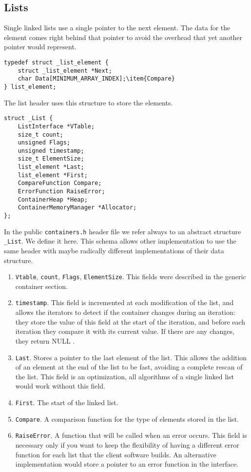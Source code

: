 \documentclass[12pt,a4paper]{memoir} %
\newcommand{\Null}{
{\footnotesize NULL}
}
\begin{document}
{{\subsection{Lists}
Single linked lists use a single pointer to the next element. The data for the element comes right behind that pointer to avoid the overhead that yet another pointer would represent.
\begin{verbatim}
typedef struct _list_element {
    struct _list_element *Next;
    char Data[MINIMUM_ARRAY_INDEX];\item{Compare}
} list_element;
\end{verbatim}
The list header uses this structure to store the elements.
\begin{verbatim}
struct _List {
    ListInterface *VTable;  
    size_t count;           
    unsigned Flags;	
    unsigned timestamp;   
    size_t ElementSize;   
    list_element *Last;   
    list_element *First;  
    CompareFunction Compare; 
    ErrorFunction RaiseError; 
    ContainerHeap *Heap;
    ContainerMemoryManager *Allocator;
};
\end{verbatim}
In the public \texttt{containers.h} header file we refer always to an abstract structure \texttt{\_List}. We define it here. This schema allows other implementation to use the same header with maybe radically different implementations of their data structure.
\begin{enumerate}
\item \texttt{Vtable}, \texttt{count}, \texttt{Flags}, \texttt{ElementSize}. This fields were described in the generic container section.
\item \texttt{timestamp}. This field is incremented at each modification of the list, and allows the iterators to detect if the container changes during an iteration: they store the value of this field at the start of the iteration, and before each iteration they compare it with its current value. If there are any changes, they return\Null.
\item \texttt{Last}. Stores a pointer to the last element of the list. This allows the addition of an element at the end of the list to be fast, avoiding a complete rescan of the list. This field is an optimization, all algorithms of a single linked list would work without this field.
\item \texttt{First}. The start of the linked list.
\item \texttt{Compare}. A comparison function for the type of elements stored in the list.
\item \texttt{RaiseError}. A function that will be called when an error occurs. This field is necessary only if you want to keep the flexibility of having a different error function for each list that the client software builds. An alternative implementation would store a pointer to an error function in the interface.

\end{enumerate}}}
\end{document}
